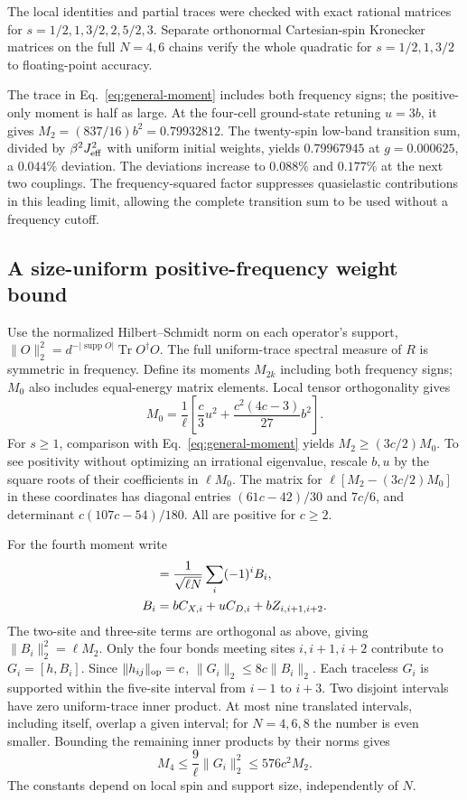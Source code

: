 The local identities and partial traces were checked with
exact rational matrices for $s=1/2,1,3/2,2,5/2,3$. Separate orthonormal
Cartesian-spin Kronecker matrices on the full $N=4,6$ chains verify the
whole quadratic for $s=1/2,1,3/2$ to floating-point accuracy.

The trace in Eq.~\eqref{eq:general-moment} includes both frequency signs;
the positive-only moment is half as large. At the four-cell ground-state
retuning $u=3b$, it gives $M_2=(837/16)b^2=0.79932812$.
The twenty-spin low-band transition sum, divided by
$\beta^2J_{\rm eff}^2$ with uniform initial weights, yields $0.79967945$
at $g=0.000625$, a $0.044\%$ deviation.
The deviations increase to $0.088\%$ and $0.177\%$ at the next two
couplings. The frequency-squared factor suppresses quasielastic
contributions in this leading limit, allowing the complete transition
sum to be used without a frequency cutoff.

\subsection{A size-uniform positive-frequency weight bound}
\label{app:weight-bound}

Use the normalized Hilbert--Schmidt norm on each operator's support,
$\|O\|_2^2=d^{-|\operatorname{supp}O|}\operatorname{Tr}O^\dagger O$.
The full uniform-trace spectral measure of $R$ is symmetric in frequency.
Define its moments $M_{2k}$ including both frequency signs; $M_0$ also
includes equal-energy matrix elements. Local tensor orthogonality gives
\begin{equation}
 M_0=\frac{1}{\ell}\left[\frac{c}{3}u^2
          +\frac{c^2(4c-3)}{27}b^2\right].
 \label{eq:uniform-M0}
\end{equation}
For $s\ge1$, comparison with Eq.~\eqref{eq:general-moment} yields
$M_2\ge(3c/2)M_0$. To see positivity without optimizing an irrational
eigenvalue, rescale $b,u$ by the square roots of their coefficients in
$\ell M_0$. The matrix for $\ell[M_2-(3c/2)M_0]$ in these coordinates has
diagonal entries $(61c-42)/30$ and $7c/6$, and determinant
$c(107c-54)/180$. All are positive for $c\ge2$.

For the fourth moment write
\begin{align}
 [h,R]&=\frac{1}{\sqrt{\ell N}}\sum_i(-1)^i B_i,\notag\\
 B_i&=bC_{X,i}+uC_{D,i}+bZ_{i,i+1,i+2}.
\end{align}
The two-site and three-site terms are orthogonal as above, giving
$\|B_i\|_2^2=\ell M_2$. Only the four bonds meeting sites $i,i+1,i+2$
contribute to $G_i=[h,B_i]$. Since $\|h_{ij}\|_{\rm op}=c$,
$\|G_i\|_2\le8c\|B_i\|_2$. Each traceless $G_i$ is supported within
the five-site interval from $i-1$ to $i+3$. Two disjoint intervals have
zero uniform-trace inner product. At most nine translated intervals,
including itself, overlap a given interval; for $N=4,6,8$ the number is
even smaller. Bounding the remaining inner products by their norms gives
\begin{equation}
 M_4\le\frac{9}{\ell}\|G_i\|_2^2
      \le576c^2M_2.
 \label{eq:uniform-M4-bound}
\end{equation}
The constants depend on local spin and support size, independently of $N$.

